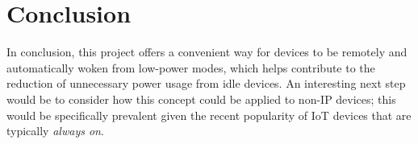 
\section{Conclusion}

In conclusion, this project offers a convenient way for devices to be remotely and automatically woken from low-power modes, which helps contribute to the reduction of unnecessary power usage from idle devices.
\x
An interesting next step would be to consider how this concept could be applied to non-IP devices; this would be specifically prevalent given the recent popularity of IoT devices that are typically \textit{always on}.